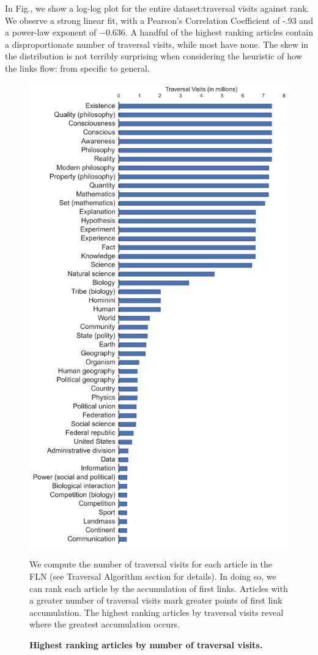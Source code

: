 \documentclass[pre,twocolumn,twoside,superscriptaddress,floatfix, aps, 10pt]{revtex4-1}
\begin{document}
In Fig., we show a log-log plot for the entire dataset:traversal visits against rank. 
We observe a strong linear fit, with a Pearson's Correlation Coefficient of -.93 and 
a power-law exponent of $-0.636$. A handful of the highest ranking articles contain a disproportionate number of traversal visits, while most have none. The skew in the distribution is not terribly surprising when considering the heuristic of how the links flow: from specific to general. 


\begin{figure}[tp!]
  \centering	
  \includegraphics[width=\columnwidth]{graphics/articles_ranked.png}
  \caption{
    \textbf{Highest ranking articles by number of traversal visits.}
  }
  We compute the number of traversal visits for each article in the FLN (see 
  Traversal Algorithm section for details). In doing so, we can rank each article
  by the accumulation of first links. Articles with a greater number of traversal visits
  mark greater points of first link accumulation. The highest ranking articles by traversal visits reveal where the greatest accumulation occurs.
  \label{fig:highest visits}
\end{figure}
\end{document}
